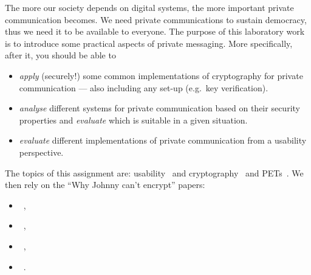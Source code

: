 The more our society depends on digital systems, the more important private 
communication becomes.
We need private communications to sustain democracy, thus we need it to be 
available to everyone.
The purpose of this laboratory work is to introduce some practical aspects of 
private messaging.
More specifically, after it, you should be able to
\begin{itemize}
  \item \emph{apply} (securely!) some common implementations of cryptography 
    for private communication --- also including any set-up (e.g.\ key 
    verification).
  \item \emph{analyse} different systems for private communication based on 
    their security properties and \emph{evaluate} which is suitable in a given 
    situation.
  \item \emph{evaluate} different implementations of private communication from 
    a usability perspective.
\end{itemize}

The topics of this assignment are: usability~\cite[Ch.~2]{Anderson2008sea} and 
cryptography~\cite[Ch.~5]{Anderson2008sea} and 
\acp{PET}~\cite[Ch.~23.4]{Anderson2008sea}.
We then rely on the \enquote{Why Johnny can't encrypt} papers:
\begin{itemize}
  \item {}~\cite{WhyJohnnyCantEncrypt},
  \item {}~\cite{WhyJohnnyStillCantEncrypt},
  \item {}~\cite{WhyJohnnyStillStillCantEncrypt},
  \item {}~\cite{CanJohnnyFinallyEncrypt}.
\end{itemize}
